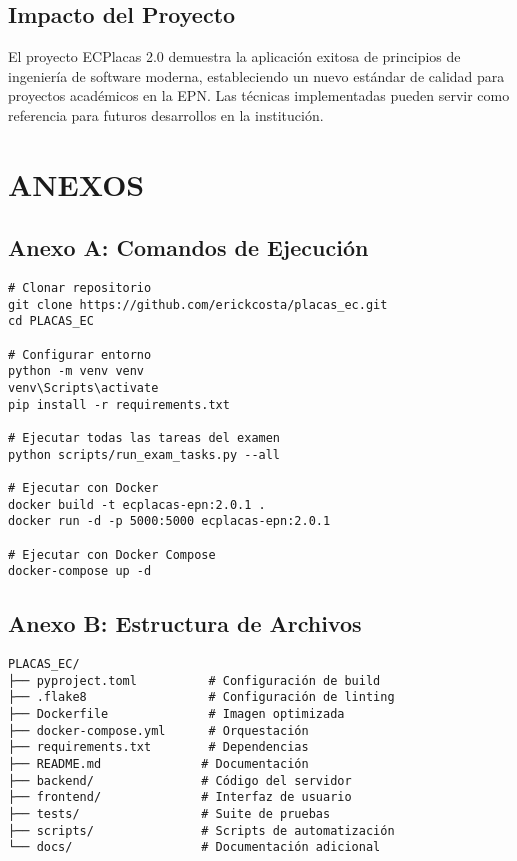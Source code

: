 \documentclass[12pt,a4paper]{article}
\begin{document}
\subsection{Impacto del Proyecto}

El proyecto ECPlacas 2.0 demuestra la aplicación exitosa de principios de ingeniería de software moderna, estableciendo un nuevo estándar de calidad para proyectos académicos en la EPN. Las técnicas implementadas pueden servir como referencia para futuros desarrollos en la institución.

\section{ANEXOS}

\subsection{Anexo A: Comandos de Ejecución}

\begin{verbatim}
# Clonar repositorio
git clone https://github.com/erickcosta/placas_ec.git
cd PLACAS_EC

# Configurar entorno
python -m venv venv
venv\Scripts\activate
pip install -r requirements.txt

# Ejecutar todas las tareas del examen
python scripts/run_exam_tasks.py --all

# Ejecutar con Docker
docker build -t ecplacas-epn:2.0.1 .
docker run -d -p 5000:5000 ecplacas-epn:2.0.1

# Ejecutar con Docker Compose
docker-compose up -d
\end{verbatim}

\subsection{Anexo B: Estructura de Archivos}

\begin{verbatim}
PLACAS_EC/
├── pyproject.toml          # Configuración de build
├── .flake8                 # Configuración de linting
├── Dockerfile              # Imagen optimizada
├── docker-compose.yml      # Orquestación
├── requirements.txt        # Dependencias
├── README.md              # Documentación
├── backend/               # Código del servidor
├── frontend/              # Interfaz de usuario
├── tests/                 # Suite de pruebas
├── scripts/               # Scripts de automatización
└── docs/                  # Documentación adicional
\end{verbatim}
\end{document}
